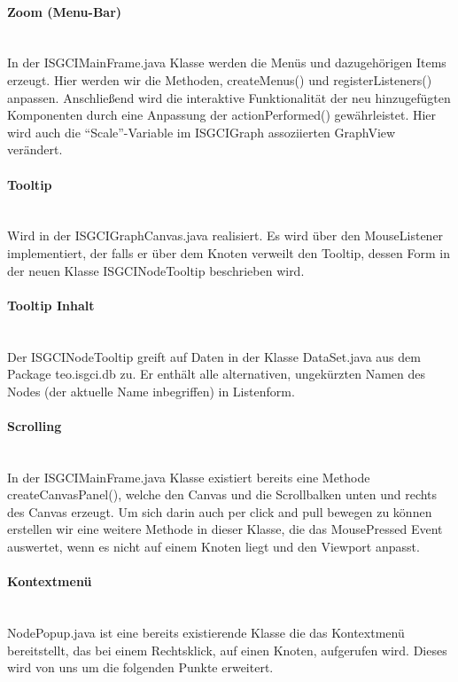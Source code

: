 \documentclass[10pt,a4paper]{article}
\begin{document}
\paragraph{Zoom (Menu-Bar)}\ \\ 

In der ISGCIMainFrame.java Klasse werden die Menüs und dazugehörigen Items erzeugt. Hier werden wir die Methoden, createMenus() und registerListeners() anpassen. Anschließend wird die interaktive Funktionalität der neu hinzugefügten Komponenten durch eine Anpassung der actionPerformed() gewährleistet. Hier wird auch die "`Scale"'-Variable im ISGCIGraph assoziierten GraphView verändert.

\paragraph{Tooltip}\ \\ 

Wird in der ISGCIGraphCanvas.java realisiert. Es wird über den MouseListener implementiert, der falls er über dem Knoten verweilt den Tooltip, dessen Form in der neuen Klasse ISGCINodeTooltip beschrieben wird.

\paragraph{Tooltip Inhalt}\ \\ 

 Der ISGCINodeTooltip greift auf Daten in der Klasse DataSet.java aus dem Package teo.isgci.db zu. Er enthält alle alternativen, ungekürzten Namen des Nodes (der aktuelle Name inbegriffen) in Listenform.

\paragraph{Scrolling}\ \\ 
In der ISGCIMainFrame.java Klasse existiert bereits eine Methode createCanvasPanel(), welche den Canvas und die Scrollbalken unten und rechts des Canvas erzeugt. Um sich darin auch per click and pull bewegen zu können erstellen wir eine weitere Methode in dieser Klasse, die das MousePressed Event auswertet, wenn es nicht auf einem Knoten liegt und den Viewport anpasst.

\paragraph{Kontextmenü}\ \\ 
NodePopup.java ist eine bereits existierende Klasse die das Kontextmenü bereitstellt, das bei einem Rechtsklick, auf einen Knoten, aufgerufen wird. Dieses wird von uns um die folgenden Punkte erweitert. 
\end{document}
